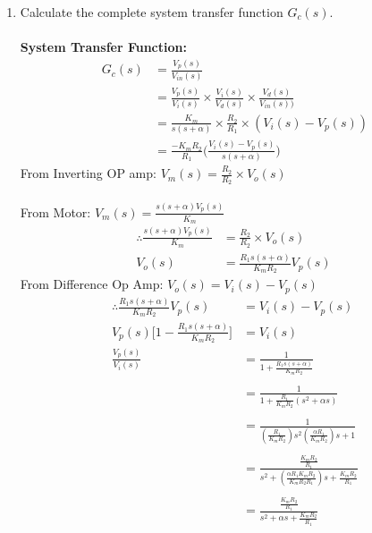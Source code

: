 \documentclass[11pt,a4paper]{article}
\begin{document}
\begin{enumerate}
\pagebreak
\item Calculate the complete system transfer function $G_c(s)$. \\\\
\textbf{System Transfer Function:}\\
	\begin{align*}
	G_{c}(s) &= \frac{V_p(s)}{V_{in}(s)}\\ 
	&= \frac{V_p(s)}{V_i(s)}\times\frac{V_i(s)}{V_d(s)}\times\frac{V_d(s)}{V_{in}(s))}\\
	&= \frac{K_m}{s(s+\alpha)}\times\frac{R_2}{R_1}\times(V_i(s)-V_p(s))\\
	&=\frac{-K_m R_2}{R_1}\bigg(\frac{V_i(s)-V_p(s)}{s(s+\alpha)}\bigg)
	\end{align*}
From Inverting OP amp: $V_m(s) = \frac{R_2}{R_2}\times V_o(s)$\\\\
From Motor: $V_m(s) = \frac{s(s+\alpha)V_p(s)}{K_m}$
	\begin{align*}
	\therefore\frac{s(s+\alpha)V_p(s)}{K_m} &= \frac{R_2}{R_2}\times V_o(s)\\	
	V_o(s) &= \frac{R_1s(s+\alpha)}{K_mR_2}V_p(s)	\
	\end{align*}
From Difference Op Amp: $V_o(s) = V_i(s) - V_p(s)$
	\begin{align*}
	\therefore\frac{R_1s(s+\alpha)}{K_mR_2}V_p(s) &= V_i(s) - V_p(s)\\	
	V_p(s)\bigg[1-\frac{R_1s(s+\alpha)}{K_mR_2}\bigg] &= V_i(s)\\
	\frac{V_p(s)}{V_i(s)} &= \frac{1}{1+\frac{R_1s(s+\alpha)}{K_mR_2}}\\\\
	&= \frac{1}{1+\frac{R_1}{K_mR_2}(s^2+\alpha s)}\\\\
	&= \frac{1}{(\frac{R_1}{K_mR_2})s^2(\frac{\alpha R_1}{K_mR_2})s+1}\\\\
	&= \frac{\frac{K_m R_2}{R_1}}{s^2+(\frac{\alpha R_1 K_m R_2}{K_m R_2 R_1})s+\frac{K_m R_2}{R_1}}\\\\
	&= \frac{\frac{K_m R_2}{R_1}}{s^2+\alpha s+\frac{K_m R_2}{R_1}}
	\end{align*}	  


\end{enumerate}
\end{document}
